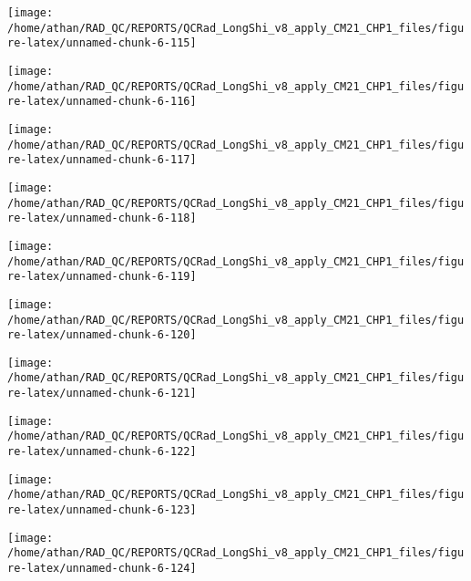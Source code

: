 \documentclass[
  10pt,
  a4paper,oneside]{article}
\begin{document}
\begin{center}\texttt{[image: /home/athan/RAD\_QC/REPORTS/QCRad\_LongShi\_v8\_apply\_CM21\_CHP1\_files/figure-latex/unnamed-chunk-6-115]} \end{center}

\begin{center}\texttt{[image: /home/athan/RAD\_QC/REPORTS/QCRad\_LongShi\_v8\_apply\_CM21\_CHP1\_files/figure-latex/unnamed-chunk-6-116]} \end{center}

\begin{center}\texttt{[image: /home/athan/RAD\_QC/REPORTS/QCRad\_LongShi\_v8\_apply\_CM21\_CHP1\_files/figure-latex/unnamed-chunk-6-117]} \end{center}

\begin{center}\texttt{[image: /home/athan/RAD\_QC/REPORTS/QCRad\_LongShi\_v8\_apply\_CM21\_CHP1\_files/figure-latex/unnamed-chunk-6-118]} \end{center}

\begin{center}\texttt{[image: /home/athan/RAD\_QC/REPORTS/QCRad\_LongShi\_v8\_apply\_CM21\_CHP1\_files/figure-latex/unnamed-chunk-6-119]} \end{center}

\begin{center}\texttt{[image: /home/athan/RAD\_QC/REPORTS/QCRad\_LongShi\_v8\_apply\_CM21\_CHP1\_files/figure-latex/unnamed-chunk-6-120]} \end{center}

\begin{center}\texttt{[image: /home/athan/RAD\_QC/REPORTS/QCRad\_LongShi\_v8\_apply\_CM21\_CHP1\_files/figure-latex/unnamed-chunk-6-121]} \end{center}

\begin{center}\texttt{[image: /home/athan/RAD\_QC/REPORTS/QCRad\_LongShi\_v8\_apply\_CM21\_CHP1\_files/figure-latex/unnamed-chunk-6-122]} \end{center}

\begin{center}\texttt{[image: /home/athan/RAD\_QC/REPORTS/QCRad\_LongShi\_v8\_apply\_CM21\_CHP1\_files/figure-latex/unnamed-chunk-6-123]} \end{center}

\begin{center}\texttt{[image: /home/athan/RAD\_QC/REPORTS/QCRad\_LongShi\_v8\_apply\_CM21\_CHP1\_files/figure-latex/unnamed-chunk-6-124]} \end{center}
\end{document}
